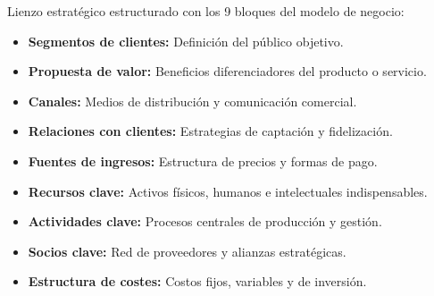 
Lienzo estratégico estructurado con los 9 bloques del modelo de negocio:
\begin{itemize}
    \item \textbf{Segmentos de clientes:} Definición del público objetivo.
    \item \textbf{Propuesta de valor:} Beneficios diferenciadores del producto o servicio.
    \item \textbf{Canales:} Medios de distribución y comunicación comercial.
    \item \textbf{Relaciones con clientes:} Estrategias de captación y fidelización.
    \item \textbf{Fuentes de ingresos:} Estructura de precios y formas de pago.
    \item \textbf{Recursos clave:} Activos físicos, humanos e intelectuales indispensables.
    \item \textbf{Actividades clave:} Procesos centrales de producción y gestión.
    \item \textbf{Socios clave:} Red de proveedores y alianzas estratégicas.
    \item \textbf{Estructura de costes:} Costos fijos, variables y de inversión.
\end{itemize}
